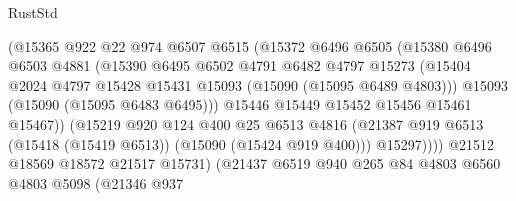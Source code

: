 \begin{lexlean}{RustStd}
\begin{coremodule}
                              (@15365
                                @922
                                @22
                                @974
                                @6507
                                @6515
                                (@15372
                                  @6496
                                  @6505
                                  (@15380
                                    @6496
                                    @6503
                                    @4881
                                    (@15390
                                      @6495
                                      @6502
                                      @4791
                                      @6482
                                      @4797
                                      @15273
                                      (@15404
                                        @2024
                                        @4797
                                        @15428
                                        @15431
                                        @15093
                                        (@15090 (@15095 @6489 @4803)))
                                      @15093
                                      (@15090 (@15095 @6483 @6495)))
                                    @15446
                                    @15449
                                    @15452
                                    @15456
                                    @15461
                                    @15467))
                                (@15219
                                  @920
                                  @124
                                  @400
                                  @25
                                  @6513
                                  @4816
                                  (@21387
                                    @919
                                    @6513
                                    (@15418 (@15419 @6513))
                                    (@15090 (@15424 @919 @400)))
                                  @15297))))
                          @21512
                          @18569
                          @18572
                          @21517
                          @15731)
                        (@21437
                          @6519
                          @940
                          @265
                          @84
                          @4803
                          @6560
                          @4803
                          @5098
                          (@21346
                            @937

\end{coremodule}
\end{lexlean}
